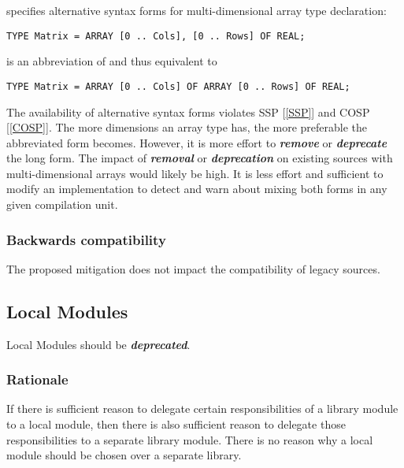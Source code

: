 \documentclass[10pt,a4paper]{article}
\renewcommand{\emph}[1]{\textbf{\textit{#1}}}
\begin{document}
\cite[p.138]{Wirth88} specifies alternative syntax forms for multi-dimensional
array type declaration:

\lstset{style=modula2}
\begin{lstlisting}
TYPE Matrix = ARRAY [0 .. Cols], [0 .. Rows] OF REAL;
\end{lstlisting}

\noindent is an abbreviation of and thus equivalent to 
\lstset{style=modula2}
\begin{lstlisting}
TYPE Matrix = ARRAY [0 .. Cols] OF ARRAY [0 .. Rows] OF REAL;
\end{lstlisting}

\par\noindent The availability of alternative syntax forms violates
SSP [\ref{SSP}] and COSP [\ref{COSP}]. The more dimensions an array type has,
the more preferable the abbreviated form becomes. However, it is more effort
to \emph{remove} or \emph{deprecate} the long form. The impact of
\emph{removal} or \emph{deprecation} on existing sources with
multi-dimensional arrays would likely be high. It is less effort and
sufficient to modify an implementation to detect and warn about mixing
both forms in any given compilation unit.

\subsubsection{Backwards compatibility}

The proposed mitigation does not impact the compatibility of legacy sources.


\subsection{Local Modules}

Local Modules should be \emph{deprecated}.

\subsubsection{Rationale}
If there is sufficient reason to delegate certain responsibilities of a library
module to a local module, then there is also sufficient reason to delegate
those responsibilities to a separate library module. There is no reason why a
local module should be chosen over a separate library.
\end{document}
